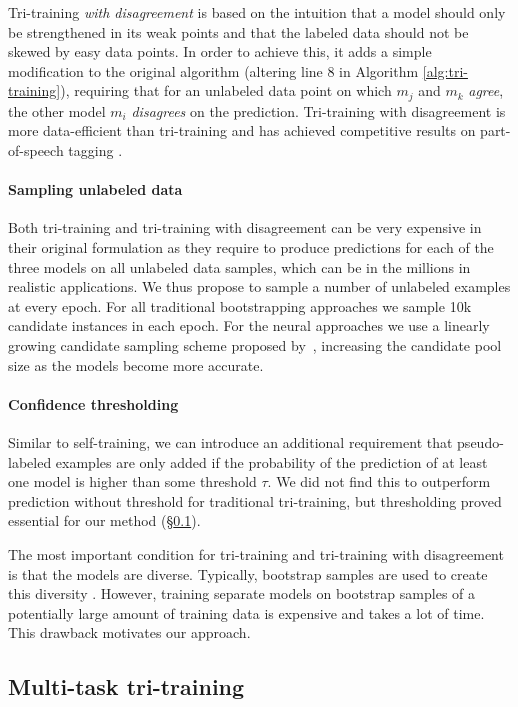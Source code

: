 \documentclass[11pt,a4paper]{article}
\begin{document}
Tri-training \textit{with disagreement} \cite{Sogaard2010} is based on the intuition that a model should only be strengthened in its weak points and that the labeled data should not be skewed by easy data points. In order to achieve this, it adds a simple modification to the original algorithm (altering line 8 in Algorithm \ref{alg:tri-training}), requiring that for an unlabeled data point on which $m_j$ and $m_k$ \emph{agree}, the other model $m_i$ \emph{disagrees} on the prediction. Tri-training with disagreement is more data-efficient than tri-training and has achieved competitive results on part-of-speech tagging \cite{Sogaard2010}.

\paragraph{Sampling unlabeled data} Both tri-training and tri-training with disagreement can be very expensive in their original formulation as they require to produce predictions for each of the three models on all unlabeled data samples, which can be in the millions in realistic applications. We thus propose to sample a number of unlabeled examples at every epoch. For all traditional bootstrapping approaches we sample 10k candidate instances in each epoch. For the neural approaches we use a linearly growing candidate sampling scheme proposed by~\cite{Saito2017},  increasing the candidate pool size as the models become more accurate.

\paragraph{Confidence thresholding} Similar to self-training, we can introduce an additional requirement that pseudo-labeled examples are only added if the probability of the prediction of at least one model is higher than some threshold $\tau$. We did not find this to outperform prediction without threshold for traditional tri-training, but thresholding proved essential for our method (\S \ref{sec:mt-tri}).

The most important condition for tri-training and tri-training with disagreement is that the models are diverse. Typically, bootstrap samples are used to create this diversity \cite{Zhou2005,Sogaard2010}. However, training separate models on bootstrap samples of a potentially large amount of training data is expensive and takes a lot of time. This drawback motivates our approach.

\subsection{Multi-task tri-training} \label{sec:mt-tri}
\end{document}
